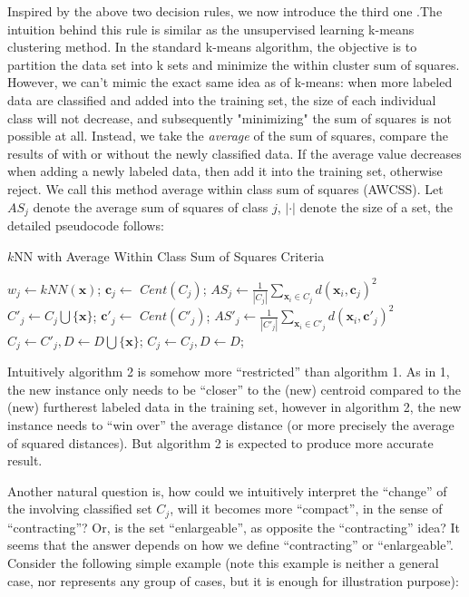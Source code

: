 \documentclass[10pt]{article}
\newcommand{\x}{\textbf{x}}
\newcommand{\cc}{\textbf{c}}
\begin{document}
Inspired by the above two decision rules, we now introduce the third one .The intuition behind this rule is similar as the unsupervised learning k-means clustering method. In the standard k-means algorithm, the objective is to partition the data set into k sets and minimize the within cluster sum of squares. However, we can't mimic the exact same idea as of k-means: when more labeled data are classified and added into the training set, the size of each individual class will not decrease, and subsequently "minimizing" the sum of squares is not possible at all. Instead, we take the \textit{average} of the sum of squares, compare the results of with or without the newly classified data. If the average value decreases when adding a newly labeled data, then add it into the training set, otherwise reject. We call this method average within class sum of squares (AWCSS). Let $AS_j$ denote the average sum of squares of class $j$, $|\cdot|$ denote the size of a set, the detailed pseudocode follows:

\begin{algorithm}
\caption{$k$NN with Average Within Class Sum of Squares Criteria}
\begin{algorithmic}[1]
\Procedure {$k$NN-AWCSS}{$\x, D$}
\State $w_j \gets kNN(\x)$;
\State $\cc_j \gets$ $Cent(C_j)$;
\State $AS_j \gets \frac{1}{|C_j|}\sum_{\x_i\in C_j} d(\x_i,\cc_j)^2$
\State $C'_j \gets C_j \bigcup \{\x\}$;
\State $\cc'_j \gets$ $Cent(C'_j)$;
\State $AS'_j \gets \frac{1}{|C'_j|}\sum_{\x_i\in C'_j} d(\x_i,\cc'_j)^2$
\State $C_j \gets C'_j, D \gets D\bigcup \{\x\}$;
\Else
\State $C_j \gets C_j, D \gets D$;
\EndIf

\EndProcedure
\end{algorithmic}
\end{algorithm}

Intuitively algorithm 2 is somehow more ``restricted'' than algorithm 1. As in 1, the new instance only needs to be ``closer'' to the (new) centroid compared to the (new) furtherest labeled data in the training set, however in algorithm 2, the new instance needs to ``win over'' the average distance (or more precisely the average of squared distances). But algorithm 2 is expected to produce more accurate result.

Another natural question is, how could we intuitively interpret the ``change'' of the involving classified set $C_j$, will it becomes more ``compact'', in the sense of ``contracting''? Or, is the set ``enlargeable'', as opposite the ``contracting'' idea? It seems that the answer depends on how we define ``contracting'' or ``enlargeable''. Consider the following simple example (note this example is neither a general case, nor represents any group of cases, but it is enough for illustration purpose):
\end{document}
